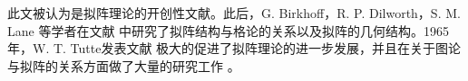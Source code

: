 	此文被认为是拟阵理论的开创性文献。此后，G. Birkhoff，R. P. Dilworth，S. M. Lane 等学者在文献 \cite{韩杰史福贵-2010-P109-P113,Birkhoff-1935-P800-P804,Dilworth-1944-P575-P587,Lane-1936-P236-P240,Lane-1938-P455-P468} 中研究了拟阵结构与格论的关系以及拟阵的几何结构。1965年，W. T. Tutte发表文献 \cite{Tutte-1965-P49-P53}极大的促进了拟阵理论的进一步发展，并且在关于图论与拟阵的关系方面做了大量的研究工作 \cite{Tutte-1959-P527-P552,Tutte-1965-P49-P53,Tutte-1966-P1301-P1324,Tutte-1966-P15-P50}。
